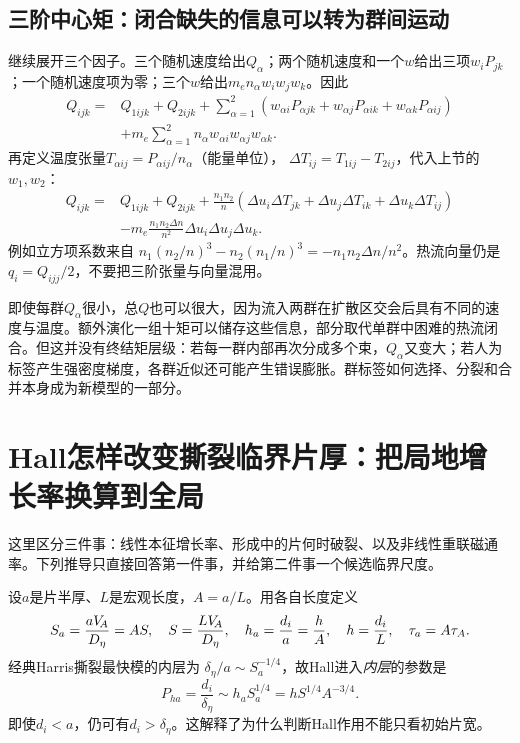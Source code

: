 \documentclass[UTF8,a4paper,11pt,openany,fontset=fandol]{ctexbook}
\begin{document}
\subsection{三阶中心矩：闭合缺失的信息可以转为群间运动}
继续展开三个因子。三个随机速度给出$Q_\alpha$；两个随机速度和一个$w$给出三项$w_iP_{jk}$；一个随机速度项为零；三个$w$给出$m_en_\alpha w_iw_jw_k$。因此
\begin{align}
 Q_{ijk}={}&Q_{1ijk}+Q_{2ijk}
 +\sum_{\alpha=1}^2
 \left(w_{\alpha i}P_{\alpha jk}+w_{\alpha j}P_{\alpha ik}
       +w_{\alpha k}P_{\alpha ij}\right)\nonumber\\
 &+m_e\sum_{\alpha=1}^2n_\alpha w_{\alpha i}w_{\alpha j}w_{\alpha k}.
\end{align}
再定义温度张量$T_{\alpha ij}=P_{\alpha ij}/n_\alpha$（能量单位），
$\Delta T_{ij}=T_{1ij}-T_{2ij}$，代入上节的$w_1,w_2$：
\begin{align}
 Q_{ijk}={}&Q_{1ijk}+Q_{2ijk}
 +\frac{n_1n_2}{n}
 \left(\Delta u_i\Delta T_{jk}+\Delta u_j\Delta T_{ik}
                       +\Delta u_k\Delta T_{ij}\right)\nonumber\\
 &-m_e\frac{n_1n_2\Delta n}{n^2}
       \Delta u_i\Delta u_j\Delta u_k.
 \label{eq:mixture_heat}
\end{align}
例如立方项系数来自
$n_1(n_2/n)^3-n_2(n_1/n)^3
=-n_1n_2\Delta n/n^2$。热流向量仍是$q_i=Q_{ijj}/2$，不要把三阶张量与向量混用。

即使每群$Q_\alpha$很小，总$Q$也可以很大，因为流入两群在扩散区交会后具有不同的速度与温度。额外演化一组十矩可以储存这些信息，部分取代单群中困难的热流闭合。但这并没有终结矩层级：若每一群内部再次分成多个束，$Q_\alpha$又变大；若人为标签产生强密度梯度，各群近似还可能产生错误膨胀。群标签如何选择、分裂和合并本身成为新模型的一部分。

\section{Hall怎样改变撕裂临界片厚：把局地增长率换算到全局}
这里区分三件事：线性本征增长率、形成中的片何时破裂、以及非线性重联磁通率。下列推导只直接回答第一件事，并给第二件事一个候选临界尺度。\citep{L236,L262}

设$a$是片半厚、$L$是宏观长度，$A=a/L$。用各自长度定义
\begin{equation}
 S_a=\frac{aV_{\!A}}{D_\eta}=AS,\quad
 S=\frac{LV_{\!A}}{D_\eta},\quad h_a=\frac{d_i}{a}=\frac{h}{A},\quad
 h=\frac{d_i}{L},\quad \tau_a=A\tau_A.
\end{equation}
经典Harris撕裂最快模的内层为
$\delta_\eta/a\sim S_a^{-1/4}$，故Hall进入\emph{内层}的参数是
\begin{equation}
 P_{ha}=\frac{d_i}{\delta_\eta}\sim h_a S_a^{1/4}
        =hS^{1/4}A^{-3/4}.
\end{equation}
即使$d_i<a$，仍可有$d_i>\delta_\eta$。这解释了为什么判断Hall作用不能只看初始片宽。
\end{document}
